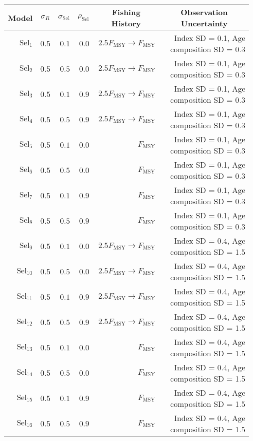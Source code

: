 \begin{center}
\begin{tabular}{rrrrrr}
\hline\hline
\multicolumn{1}{c}{Model}&\multicolumn{1}{c}{$\sigma_R$}&\multicolumn{1}{c}{$\sigma_{\text{Sel}}$}&\multicolumn{1}{c}{$\rho_{\text{Sel}}$}&\multicolumn{1}{c}{Fishing History}&\multicolumn{1}{c}{Observation Uncertainty}\tabularnewline
\hline
$\text{Sel}_{1}$&$0.5$&$0.1$&$0.0$&$2.5 F_{\text{MSY}} \rightarrow F_{\text{MSY}}$&Index SD = 0.1, Age composition SD = 0.3\tabularnewline
$\text{Sel}_{2}$&$0.5$&$0.5$&$0.0$&$2.5 F_{\text{MSY}} \rightarrow F_{\text{MSY}}$&Index SD = 0.1, Age composition SD = 0.3\tabularnewline
$\text{Sel}_{3}$&$0.5$&$0.1$&$0.9$&$2.5 F_{\text{MSY}} \rightarrow F_{\text{MSY}}$&Index SD = 0.1, Age composition SD = 0.3\tabularnewline
$\text{Sel}_{4}$&$0.5$&$0.5$&$0.9$&$2.5 F_{\text{MSY}} \rightarrow F_{\text{MSY}}$&Index SD = 0.1, Age composition SD = 0.3\tabularnewline
$\text{Sel}_{5}$&$0.5$&$0.1$&$0.0$&$F_{\text{MSY}}$&Index SD = 0.1, Age composition SD = 0.3\tabularnewline
$\text{Sel}_{6}$&$0.5$&$0.5$&$0.0$&$F_{\text{MSY}}$&Index SD = 0.1, Age composition SD = 0.3\tabularnewline
$\text{Sel}_{7}$&$0.5$&$0.1$&$0.9$&$F_{\text{MSY}}$&Index SD = 0.1, Age composition SD = 0.3\tabularnewline
$\text{Sel}_{8}$&$0.5$&$0.5$&$0.9$&$F_{\text{MSY}}$&Index SD = 0.1, Age composition SD = 0.3\tabularnewline
$\text{Sel}_{9}$&$0.5$&$0.1$&$0.0$&$2.5 F_{\text{MSY}} \rightarrow F_{\text{MSY}}$&Index SD = 0.4, Age composition SD = 1.5\tabularnewline
$\text{Sel}_{10}$&$0.5$&$0.5$&$0.0$&$2.5 F_{\text{MSY}} \rightarrow F_{\text{MSY}}$&Index SD = 0.4, Age composition SD = 1.5\tabularnewline
$\text{Sel}_{11}$&$0.5$&$0.1$&$0.9$&$2.5 F_{\text{MSY}} \rightarrow F_{\text{MSY}}$&Index SD = 0.4, Age composition SD = 1.5\tabularnewline
$\text{Sel}_{12}$&$0.5$&$0.5$&$0.9$&$2.5 F_{\text{MSY}} \rightarrow F_{\text{MSY}}$&Index SD = 0.4, Age composition SD = 1.5\tabularnewline
$\text{Sel}_{13}$&$0.5$&$0.1$&$0.0$&$F_{\text{MSY}}$&Index SD = 0.4, Age composition SD = 1.5\tabularnewline
$\text{Sel}_{14}$&$0.5$&$0.5$&$0.0$&$F_{\text{MSY}}$&Index SD = 0.4, Age composition SD = 1.5\tabularnewline
$\text{Sel}_{15}$&$0.5$&$0.1$&$0.9$&$F_{\text{MSY}}$&Index SD = 0.4, Age composition SD = 1.5\tabularnewline
$\text{Sel}_{16}$&$0.5$&$0.5$&$0.9$&$F_{\text{MSY}}$&Index SD = 0.4, Age composition SD = 1.5\tabularnewline
\hline
\end{tabular}\end{center}
